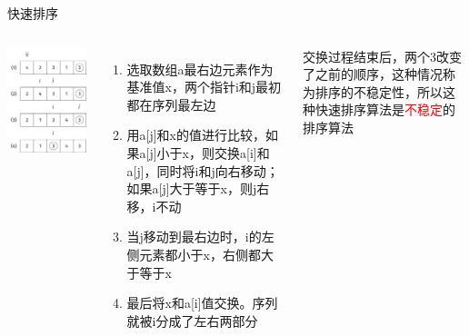 \begin{frame}{快速排序}
    \begin{columns}
        \includegraphics[scale=.6]{fig/2-3.pdf}
        \begin{enumerate}[(1)]
            \item 选取数组a最右边元素作为基准值x，两个指针i和j最初都在序列最左边
            \pause
            \item 用a[j]和x的值进行比较，如果a[j]小于x，则交换a[i]和a[j]，同时将i和j向右移动；如果a[j]大于等于x，则j右移，i不动
            \pause
            \item 当j移动到最右边时，i的左侧元素都小于x，右侧都大于等于x
            \pause
            \item 最后将x和a[i]值交换。序列就被i分成了左右两部分
            \pause
        \end{enumerate}
        交换过程结束后，两个3改变了之前的顺序，这种情况称为排序的不稳定性，所以这种快速排序算法是\textcolor{red}{不稳定}的排序算法
    \end{columns}
\end{frame}
